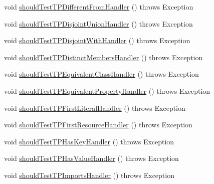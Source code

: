 \begin{DoxyCompactItemize}
\item 
void \hyperlink{classorg_1_1semanticweb_1_1owlapi_1_1contract_1_1_contract_rdfxml_parser_test_a163509e3ec459d67f417a9a023f79b28}{should\-Test\-T\-P\-Different\-From\-Handler} ()  throws Exception 
\item 
void \hyperlink{classorg_1_1semanticweb_1_1owlapi_1_1contract_1_1_contract_rdfxml_parser_test_af1b796f80b4ec031b93e82c40a78e573}{should\-Test\-T\-P\-Disjoint\-Union\-Handler} ()  throws Exception 
\item 
void \hyperlink{classorg_1_1semanticweb_1_1owlapi_1_1contract_1_1_contract_rdfxml_parser_test_a537d4a556e0e907223117e79aa734f8d}{should\-Test\-T\-P\-Disjoint\-With\-Handler} ()  throws Exception 
\item 
void \hyperlink{classorg_1_1semanticweb_1_1owlapi_1_1contract_1_1_contract_rdfxml_parser_test_a8472da685a273746f6f1cea53fcd2645}{should\-Test\-T\-P\-Distinct\-Members\-Handler} ()  throws Exception 
\item 
void \hyperlink{classorg_1_1semanticweb_1_1owlapi_1_1contract_1_1_contract_rdfxml_parser_test_a7784de194b22d92c79c0b99e0338fe1b}{should\-Test\-T\-P\-Equivalent\-Class\-Handler} ()  throws Exception 
\item 
void \hyperlink{classorg_1_1semanticweb_1_1owlapi_1_1contract_1_1_contract_rdfxml_parser_test_a7fb9e48ec214396c97bd4f21a4622170}{should\-Test\-T\-P\-Equivalent\-Property\-Handler} ()  throws Exception 
\item 
void \hyperlink{classorg_1_1semanticweb_1_1owlapi_1_1contract_1_1_contract_rdfxml_parser_test_a8c19e7a2da3013bd65e64dbd00b2d749}{should\-Test\-T\-P\-First\-Literal\-Handler} ()  throws Exception 
\item 
void \hyperlink{classorg_1_1semanticweb_1_1owlapi_1_1contract_1_1_contract_rdfxml_parser_test_a7c7d0cb848ffcc723b7a78fb667dce4a}{should\-Test\-T\-P\-First\-Resource\-Handler} ()  throws Exception 
\item 
void \hyperlink{classorg_1_1semanticweb_1_1owlapi_1_1contract_1_1_contract_rdfxml_parser_test_a6d49e77f5cb79e30454797dfd0f242d9}{should\-Test\-T\-P\-Has\-Key\-Handler} ()  throws Exception 
\item 
void \hyperlink{classorg_1_1semanticweb_1_1owlapi_1_1contract_1_1_contract_rdfxml_parser_test_a22d2a86792d5e50ce9ac6f0b590deabc}{should\-Test\-T\-P\-Has\-Value\-Handler} ()  throws Exception 
\item 
void \hyperlink{classorg_1_1semanticweb_1_1owlapi_1_1contract_1_1_contract_rdfxml_parser_test_a6b5cd3a7af64bbc603e5b7956cde97f5}{should\-Test\-T\-P\-Imports\-Handler} ()  throws Exception 

\end{DoxyCompactItemize}
